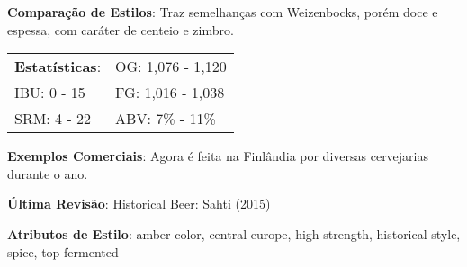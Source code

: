 \textbf{Comparação de Estilos}: Traz semelhanças com Weizenbocks, porém doce e espessa, com caráter de centeio e zimbro.

\begin{tabular}{@{}p{35mm}p{35mm}@{}}
  \textbf{Estatísticas}: & OG: 1,076 - 1,120 \\
  IBU: 0 - 15  & FG: 1,016 - 1,038  \\
  SRM: 4 - 22 & ABV: 7\% - 11\%
\end{tabular}

\textbf{Exemplos Comerciais}: Agora é feita na Finlândia por diversas cervejarias durante o ano.

\textbf{Última Revisão}: Historical Beer: Sahti (2015)

\textbf{Atributos de Estilo}: amber-color, central-europe, high-strength, historical-style, spice, top-fermented